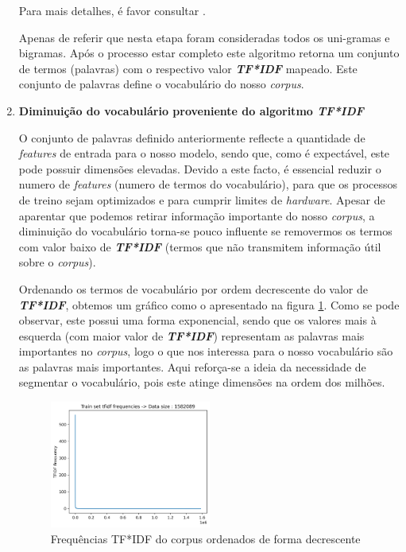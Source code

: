\begin{enumerate}
Para mais detalhes, é favor consultar \cite{TF_IDF_algorithm}.

Apenas de referir que nesta etapa foram consideradas todos os uni-gramas e bigramas. Após o processo estar completo este algoritmo retorna um conjunto de termos (palavras) com o respectivo valor \textbf{\textit{TF*IDF}} mapeado. Este conjunto de palavras define o vocabulário do nosso \textit{corpus}. 

\bigbreak
\item \textbf{Diminuição do vocabulário proveniente do algoritmo \textit{TF*IDF}}

O conjunto de palavras definido anteriormente reflecte a quantidade de \textit{features} de entrada para o nosso modelo, sendo que, como é expectável, este pode possuir dimensões elevadas. Devido a este facto, é essencial reduzir o numero de \textit{features} (numero de termos do vocabulário), para que os processos de treino sejam optimizados e para cumprir limites de \textit{hardware}. Apesar de aparentar que podemos retirar informação importante do nosso \textit{corpus}, a diminuição do vocabulário torna-se pouco influente se removermos os termos com valor baixo de \textbf{\textit{TF*IDF}} (termos que não transmitem informação útil sobre o \textit{corpus}).

Ordenando os termos de vocabulário por ordem decrescente do valor de \textbf{\textit{TF*IDF}}, obtemos um gráfico como o apresentado na figura \ref{diagram:data_n_knee}. Como se pode observar, este possui uma forma exponencial, sendo que os valores mais à esquerda (com maior valor de \textbf{\textit{TF*IDF}}) representam as palavras mais importantes no \textit{corpus}, logo o que nos interessa para o nosso vocabulário são as palavras mais importantes. Aqui reforça-se a ideia da necessidade de segmentar o vocabulário, pois este atinge dimensões na ordem dos milhões.

\begin{figure}[t]
\begin{center}
\includegraphics[width=0.5\textwidth,keepaspectratio]{figures/data_n_knee.png}
\caption{Frequências TF*IDF do corpus ordenados de forma decrescente }
\label{diagram:data_n_knee}
\centering
\end{center}
\end{figure}


\end{enumerate}
